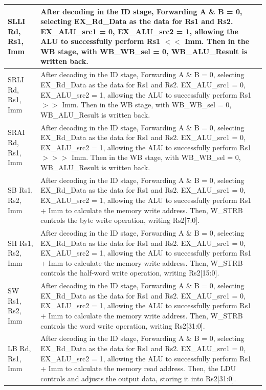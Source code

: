 \documentclass[12pt,a4paper]{report}
\begin{document}
\begin{longtable}{|l|p{12cm}|}
SLLI Rd, Rs1, Imm & After decoding in the ID stage, Forwarding A \& B = 0, selecting EX\_Rd\_Data as the data for Rs1 and Rs2. EX\_ALU\_src1 = 0, EX\_ALU\_src2 = 1, allowing the ALU to successfully perform Rs1 $<<$ Imm. Then in the WB stage, with WB\_WB\_sel = 0, WB\_ALU\_Result is written back. \\
\hline

SRLI Rd, Rs1, Imm & After decoding in the ID stage, Forwarding A \& B = 0, selecting EX\_Rd\_Data as the data for Rs1 and Rs2. EX\_ALU\_src1 = 0, EX\_ALU\_src2 = 1, allowing the ALU to successfully perform Rs1 $>>$ Imm. Then in the WB stage, with WB\_WB\_sel = 0, WB\_ALU\_Result is written back. \\
\hline

SRAI Rd, Rs1, Imm & After decoding in the ID stage, Forwarding A \& B = 0, selecting EX\_Rd\_Data as the data for Rs1 and Rs2. EX\_ALU\_src1 = 0, EX\_ALU\_src2 = 1, allowing the ALU to successfully perform Rs1 $>>>$ Imm. Then in the WB stage, with WB\_WB\_sel = 0, WB\_ALU\_Result is written back. \\
\hline

SB Rs1, Rs2, Imm & After decoding in the ID stage, Forwarding A \& B = 0, selecting EX\_Rd\_Data as the data for Rs1 and Rs2. EX\_ALU\_src1 = 0, EX\_ALU\_src2 = 1, allowing the ALU to successfully perform Rs1 + Imm to calculate the memory write address. Then, W\_STRB controls the byte write operation, writing Rs2[7:0]. \\
\hline

SH Rs1, Rs2, Imm & After decoding in the ID stage, Forwarding A \& B = 0, selecting EX\_Rd\_Data as the data for Rs1 and Rs2. EX\_ALU\_src1 = 0, EX\_ALU\_src2 = 1, allowing the ALU to successfully perform Rs1 + Imm to calculate the memory write address. Then, W\_STRB controls the half-word write operation, writing Rs2[15:0]. \\
\hline

SW Rs1, Rs2, Imm & After decoding in the ID stage, Forwarding A \& B = 0, selecting EX\_Rd\_Data as the data for Rs1 and Rs2. EX\_ALU\_src1 = 0, EX\_ALU\_src2 = 1, allowing the ALU to successfully perform Rs1 + Imm to calculate the memory write address. Then, W\_STRB controls the word write operation, writing Rs2[31:0]. \\
\hline

LB Rd, Rs1, Imm & After decoding in the ID stage, Forwarding A \& B = 0, selecting EX\_Rd\_Data as the data for Rs1 and Rs2. EX\_ALU\_src1 = 0, EX\_ALU\_src2 = 1, allowing the ALU to successfully perform Rs1 + Imm to calculate the memory read address. Then, the LDU controls and adjusts the output data, storing it into Rs2[31:0]. \\
\hline


\end{longtable}
\end{document}

